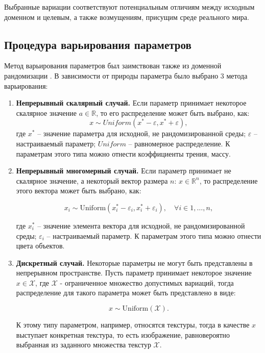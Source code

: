         Выбранные вариации соответствуют потенциальным отличиям между исходным доменном и целевым, а также возмущениям, присущим среде реального мира. 

    \subsection{Процедура варьирования параметров}
         \label{method_randomization}
        Метод варьирования параметров был заимствован также из доменной рандомизации \cite{Peng_2018}. В зависимости от природы параметра было выбрано 3 метода варьирования:

        \begin{enumerate}
            \item \textbf{Непрерывный скалярный случай.} Если параметр принимает некоторое скалярное значение $a \in \mathbb{R}$, то его распределение может быть выбрано, как:
            \begin{equation}
                x \sim Uniform(x^* - \varepsilon, x^* + \varepsilon),
            \end{equation}
            где $x^*$ -- значение параметра для исходной, не рандомизированной среды; $\varepsilon$ --  настраиваемый параметр; $Uniform$ -- равномерное распределение. К параметрам этого типа можно отнести коэффициенты трения, массу. 

            \item \textbf{Непрерывный многомерный случай.} Если параметр принимает не скалярное значение, а некоторый вектор размера $n$: $x \in \mathbb{R}^n$, то распределение этого вектора может быть выбрано, как: 

                \begin{equation}
                    x_i \sim \mathrm{Uniform}(x_i^* - \varepsilon_i, x_i^* + \varepsilon_i), \quad \forall i \in {1, \dots, n},
                \end{equation}

            где $x_i^*$ -- значение элемента вектора для исходной, не рандомизированной среды; $\varepsilon_i$ --  настраиваемый параметр. К параметрам этого типа можно отнести цвета объектов.
 
            \item \textbf{Дискретный случай.} Некоторые параметры не могут быть представлены в непрерывном пространстве. Пусть параметр принимает некоторое значение $x \in \mathcal{X}$, где $\mathcal{X}$ - ограниченное множество допустимых вариаций, тогда распределение для такого параметра может быть представлено в виде:
            
            \begin{equation}
                x \sim \mathrm{Uniform}(\mathcal{X}).
            \end{equation}

            К этому типу параметром, например, относятся текстуры, тогда в качестве $x$ выступает конкретная текстура, то есть изображение, равновероятно выбранная из заданного множества текстур $\mathcal{X}$.
             
        \end{enumerate}

